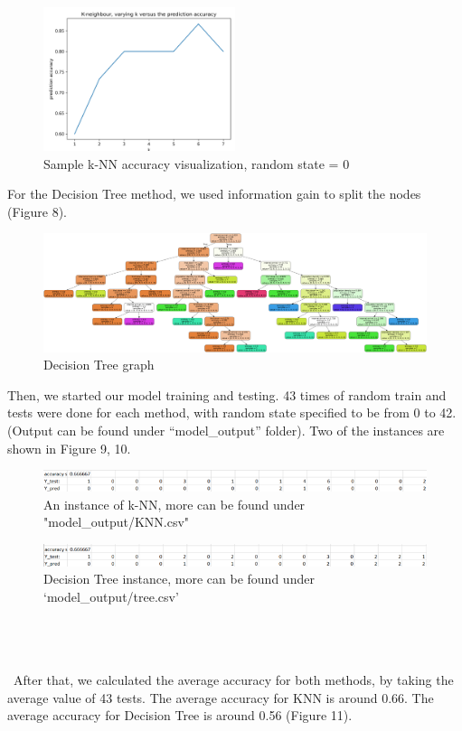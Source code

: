 \documentclass[a4, 11pt]{article}
\begin{document}
\begin{figure}[ht]
    \centering
    \includegraphics[width=0.5\textwidth]{graph/Sample k-NN accuracy visualization.png}
    \caption{Sample k-NN accuracy visualization, random state = 0}
    \label{fig:my_label}
\end{figure}

For the Decision Tree method, we used information gain to split the nodes (Figure 8).

\begin{figure}[ht]
    \centering
    \includegraphics[width=1.05\textwidth]{graph/mytree.png}
    \caption{Decision Tree graph}
    \label{fig:my_label}
\end{figure}
Then, we started our model training and testing. 43 times of random train and tests were done for each method, with random state specified to be from 0 to 42. (Output can be found under “model\_output” folder). Two of the instances are shown in Figure 9, 10. 
\begin{figure}[ht]
    \centering
    \includegraphics[width=1\textwidth]{captures for report/KNN instance.png}
    \caption{An instance of k-NN, more can be found under "model\_output/KNN.csv"}
    \label{fig:my_label}
\end{figure}

\begin{figure}[ht]
    \centering
    \includegraphics[width=1\textwidth]{captures for report/Decision Tree instance.png}
    \caption{Decision Tree instance, more can be found under ‘model\_output/tree.csv’ }
    \label{fig:my_label}
\end{figure}
\
\\\\\\\
After that, we calculated the average accuracy for both methods, by taking the average value of 43 tests. The average accuracy for KNN is around 0.66. The average accuracy for Decision Tree is around 0.56 (Figure 11).
\end{document}
